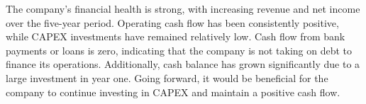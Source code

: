 

The company's financial health is strong, with increasing revenue and net income over the five-year period. Operating cash flow has been consistently positive, while CAPEX investments have remained relatively low. Cash flow from bank payments or loans is zero, indicating that the company is not taking on debt to finance its operations. Additionally, cash balance has grown significantly due to a large investment in year one. Going forward, it would be beneficial for the company to continue investing in CAPEX and maintain a positive cash flow.